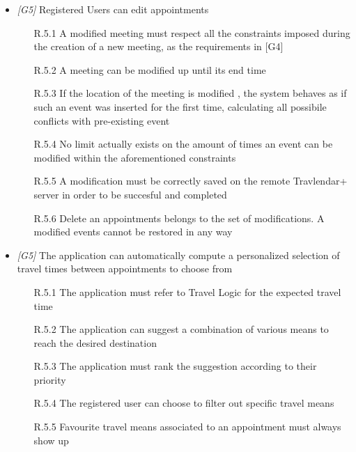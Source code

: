 \begin{itemize}
\begin{itemize}
                  \end{itemize}
                  
\item \textit{[G5]} Registered Users can edit appointments

                  \begin{itemize}
                       \item  [R.5.1] A modified meeting must respect all the constraints imposed during the creation of a new meeting, as the requirements in [G4]
                       \item [R.5.2] A meeting can be modified up until its end time
                       \item [R.5.3] If the location of the meeting is modified , the system behaves as if such an event was inserted for the first time, calculating all possibile conflicts with pre-existing event
                       \item [R.5.4] No limit actually exists on the amount of times an event can be modified within the aforementioned constraints 
                       \item [R.5.5] A modification must be correctly saved on the remote Travlendar+ server in order to be succesful and completed              
                       \item [R.5.6] Delete an appointments belongs to the set of modifications. A modified events cannot be restored in any way

                 \end{itemize}

\item \textit{[G5]} The application can automatically compute a personalized selection of travel times between appointments to choose from

                  \begin{itemize}
                        \item [R.5.1] The application must refer to Travel Logic for the expected travel time 
                        \item [R.5.2] The application can suggest a combination of various means to reach the desired destination
                        \item [R.5.3] The application must rank the suggestion according to their priority 
                        \item [R.5.4] The registered user can choose to filter out specific travel means
                        \item [R.5.5] Favourite travel means associated to an appointment must always show up
                        

\end{itemize}
\end{itemize}
